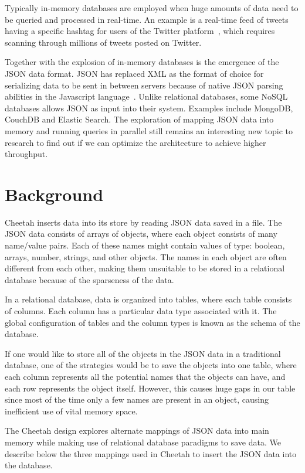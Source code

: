 \documentclass[11pt,journal,compsoc]{IEEEtran}
\begin{document}
Typically in-memory databases are employed when huge amounts of data need to be queried and processed in real-time. An example is a real-time feed of tweets having a specific hashtag for users of the Twitter platform~\cite{twitter}, which requires scanning through millions of tweets posted on Twitter.


Together with the explosion of in-memory databases is the emergence of the JSON data format. JSON has replaced XML as the format of choice for serializing data to be sent in between servers because of native JSON parsing abilities in the Javascript language~\cite{json}. Unlike relational databases, some NoSQL databases allows JSON as input into their system. Examples include MongoDB, CouchDB and Elastic Search. The exploration of mapping JSON data into memory and running queries in parallel still remains an interesting new topic to research to find out if we can optimize the architecture to achieve higher throughput.


\section{Background}
Cheetah inserts data into its store by reading JSON data saved in a file. The JSON data consists of arrays of objects, where each object consists of many name/value pairs. Each of these names might contain values of type: boolean, arrays, number, strings, and other objects. The names in each object are often different from each other, making them unsuitable to be stored in a relational database because of the sparseness of the data.


In a relational database, data is organized into tables, where each table consists of columns. Each column has a particular data type associated with it. The global configuration of tables and the column types is known as the schema of the database.


If one would like to store all of the objects in the JSON data in a traditional database, one of the strategies would be to save the objects into one table, where each column represents all the potential names that the objects can have, and each row represents the object itself. However, this causes huge gaps in our table since most of the time only a few names are present in an object, causing inefficient use of vital memory space.


The Cheetah design explores alternate mappings of JSON data into main memory while making use of relational database paradigms to save data. We describe below the three mappings used in Cheetah to insert the JSON data into the database.
\end{document}

